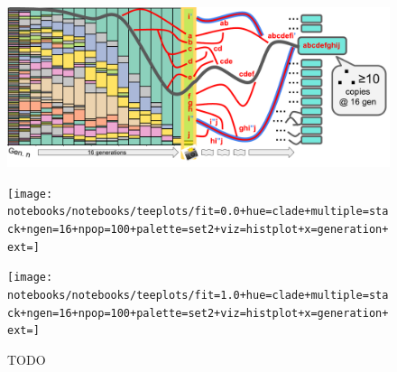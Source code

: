 \begin{figure}
  \centering
  \begin{minipage}{.8\textwidth} %

    \begin{minipage}{\textwidth}
      \centering
      \includegraphics[height=0.4\textheight]{img/copy-count-snapshot}
      \label{fig:ne-example-replicates:bottleneck}
    \end{minipage}%

    \vspace{1cm}

    \begin{minipage}{0.5\textwidth}
      \centering
      \texttt{[image: notebooks/notebooks/teeplots/fit=0.0+hue=clade+multiple=stack+ngen=16+npop=100+palette=set2+viz=histplot+x=generation+ext=]}
      \label{fig:ne-example-replicates:selection_pressure}
    \end{minipage}%
    \begin{minipage}{0.5\textwidth}
      \centering
      \texttt{[image: notebooks/notebooks/teeplots/fit=1.0+hue=clade+multiple=stack+ngen=16+npop=100+palette=set2+viz=histplot+x=generation+ext=]}
      \label{fig:ne-example-replicates:control}
    \end{minipage}

  \end{minipage}
  \hfill %
  \begin{minipage}{.15\textwidth} %
    \caption{TODO
    }
    \label{fig:ne-example-replicates}
  \end{minipage}

\end{figure}


%
%
%
